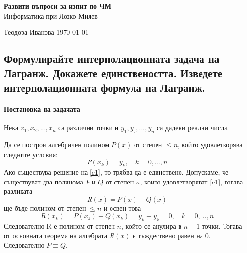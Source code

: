 \documentclass[12pt]{article}
\numberwithin{equation}{subsection}
\numberwithin{theorem}{subsection}
\numberwithin{definition}{subsection}
\numberwithin{corollary}{subsection}
\begin{document}
\begin{titlepage}
\begin{center}
    \vspace{5em}
    \textbf{\Huge{Развити въпроси за изпит по ЧМ}}\\
    \vspace{2em}
    \LARGE{Информатика при Лозко Милев}
\end{center}
\vfill

Теодора Иванова \hfill \today
\end{titlepage}
\tableofcontents
\pagebreak
\subsection{Формулирайте интерполационната задача на Лагранж. Докажете единствеността. Изведете интерполационната формула на Лагранж.}
  \paragraph{Постановка на задачата\\}
  Нека $x_1,x_2,...,x_n$ са различни точки и $y_1,y_2,...,y_n$ са дадени
  реални числа.
  \par
  Да се построи алгебричен полином $P(x)$ от степен $\leq n$, който удовлетворява следните условия:\\
  \begin{equation} \label{e1}
          P(x_k) = y_k,\hspace{12pt} k=0,\dotso,n 
  \end{equation}
  \theorem Ако съществува решение на \ref{e1}, то трябва да е единствено.
  \proof
  Допускаме, че съществуват два полинома $P$ и $Q$ от степен $n$, които удовлетворяват \ref{e1}, тогава разликата
  \begin{equation*}
  R(x) = P(x) - Q(x)
  \end{equation*}
  ще бъде полином от степен $\leq n$ и освен това 
  \begin{equation*}
  R(x_k) = P(x_k) - Q(x_k) = y_k - y_k = 0,\hspace{12pt}k=0,\dotso,n
  \end{equation*}
  Следователно R е полином от степен $n$, който се анулира в $n+1$ точки. Тогава от основната теорема на алгебрата $R(x)$ е тъждествено равен на 0. Следователно $P\equiv Q$.
\end{document}
